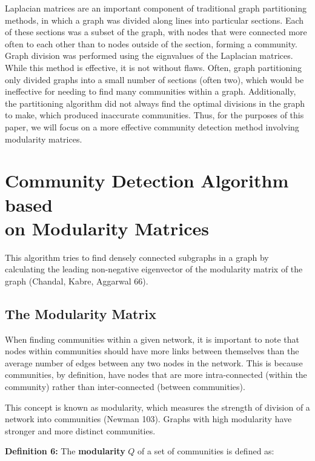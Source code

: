 \documentclass{article}
\begin{document}
\bigskip 

Laplacian matrices are an important component of traditional graph partitioning methods, in which a graph was divided along lines into particular sections.
Each of these sections was a subset of the graph, with nodes that were connected more often to each other than to nodes outside of the section, forming a community. 
Graph division was performed using the eignvalues of the Laplacian matrices. While this method is effective, it is not without flaws. 
Often, graph partitioning only divided graphs into a small number of sections (often two), which would be ineffective for needing to find many communities within a graph.
Additionally, the partitioning algorithm did not always find the optimal divisions in the graph to make, which produced inaccurate communities.
Thus, for the purposes of this paper, we will focus on a more effective community detection method involving modularity matrices.

\bigskip 

\section{Community Detection Algorithm based \\ on Modularity Matrices}
This algorithm tries to find densely connected subgraphs in a graph by calculating the leading non-negative eigenvector of the modularity matrix of the graph (Chandal, Kabre, Aggarwal 66). 


\subsection{The Modularity Matrix}
When finding communities within a given network, it is important to note that nodes within communities should have more links between themselves than the average number of edges between any two nodes in the network. 
This is because communities, by definition, have nodes that are more intra-connected (within the community) rather than inter-connected (between communities).

This concept is known as modularity, which measures the strength of division of a network into communities (Newman 103). 
Graphs with high modularity have stronger and more distinct communities.

\bigskip

\textbf{Definition 6:} The \textbf{modularity} $Q$ of a set of communities is defined as: 

\bigskip
\end{document}
